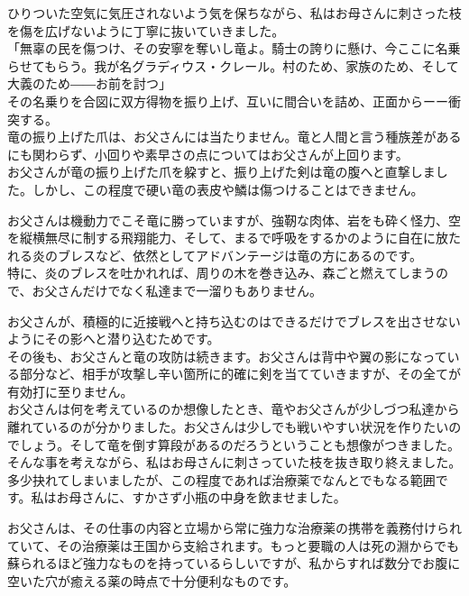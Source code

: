 \documentclass[oneside, a4paper]{jsbook}
\begin{document}
ひりついた空気に気圧されないよう気を保ちながら、私はお母さんに刺さった枝を傷を広げないように丁寧に抜いていきました。\\

\noindent
「無辜の民を傷つけ、その安寧を奪いし竜よ。騎士の誇りに懸け、今ここに名乗らせてもらう。我が名グラディウス・クレール。村のため、家族のため、そして大義のため――お前を討つ」\\

その名乗りを合図に双方得物を振り上げ、互いに間合いを詰め、正面からーー衝突する。\\

竜の振り上げた爪は、お父さんには当たりません。竜と人間と言う種族差があるにも関わらず、小回りや素早さの点についてはお父さんが上回ります。\\

お父さんが竜の振り上げた爪を躱すと、振り上げた剣は竜の腹へと直撃しました。しかし、この程度で硬い竜の表皮や鱗は傷つけることはできません。

お父さんは機動力でこそ竜に勝っていますが、強靭な肉体、岩をも砕く怪力、空を縦横無尽に制する飛翔能力、そして、まるで呼吸をするかのように自在に放たれる炎のブレスなど、依然としてアドバンテージは竜の方にあるのです。\\

特に、炎のブレスを吐かれれば、周りの木を巻き込み、森ごと燃えてしまうので、お父さんだけでなく私達まで一溜りもありません。

お父さんが、積極的に近接戦へと持ち込むのはできるだけでブレスを出させないようにその影へと潜り込むためです。\\

その後も、お父さんと竜の攻防は続きます。お父さんは背中や翼の影になっている部分など、相手が攻撃し辛い箇所に的確に剣を当てていきますが、その全てが有効打に至りません。\\

お父さんは何を考えているのか想像したとき、竜やお父さんが少しづつ私達から離れているのが分かりました。お父さんは少しでも戦いやすい状況を作りたいのでしょう。そして竜を倒す算段があるのだろうということも想像がつきました。\\

そんな事を考えながら、私はお母さんに刺さっていた枝を抜き取り終えました。多少抉れてしまいましたが、この程度であれば治療薬でなんとでもなる範囲です。私はお母さんに、すかさず小瓶の中身を飲ませました。

お父さんは、その仕事の内容と立場から常に強力な治療薬の携帯を義務付けられていて、その治療薬は王国から支給されます。もっと要職の人は死の淵からでも蘇られるほど強力なものを持っているらしいですが、私からすれば数分でお腹に空いた穴が癒える薬の時点で十分便利なものです。\\
\end{document}
